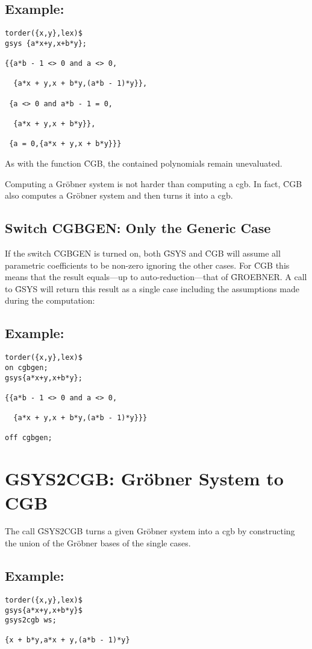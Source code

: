 \subsection*{Example:}
\begin{verbatim}
torder({x,y},lex)$
gsys {a*x+y,x+b*y};

{{a*b - 1 <> 0 and a <> 0,

  {a*x + y,x + b*y,(a*b - 1)*y}},

 {a <> 0 and a*b - 1 = 0,

  {a*x + y,x + b*y}},

 {a = 0,{a*x + y,x + b*y}}}
\end{verbatim}
As with the function \f{CGB}, the contained polynomials remain
unevaluated.

Computing a Gr\"obner system is not harder than computing a {\sc cgb}.
In fact, \f{CGB} also computes a Gr\"obner system and then turns it
into a {\sc cgb}.

\subsection{Switch CGBGEN: Only the Generic Case}
If the switch \f{CGBGEN} is turned on, both \f{GSYS} and 
\f{CGB} will assume all parametric coefficients to be non-zero ignoring
the other cases. For \f{CGB} this means that the result equals---up
to auto-reduction---that of \f{GROEBNER}. A call to \f{GSYS} will
return this result as a single case including the assumptions made
during the computation:
%
\subsection*{Example:}
\begin{verbatim}
torder({x,y},lex)$
on cgbgen;
gsys{a*x+y,x+b*y};

{{a*b - 1 <> 0 and a <> 0,

  {a*x + y,x + b*y,(a*b - 1)*y}}}

off cgbgen;
\end{verbatim}
%
\section{GSYS2CGB: Gr\"obner System to CGB}
The call \f{GSYS2CGB} turns a given Gr\"obner system into a 
{\sc cgb} by constructing the union of the Gr\"obner bases of the single
cases.
%
\subsection*{Example:}
\begin{verbatim}
torder({x,y},lex)$
gsys{a*x+y,x+b*y}$
gsys2cgb ws;

{x + b*y,a*x + y,(a*b - 1)*y}
\end{verbatim}
%
